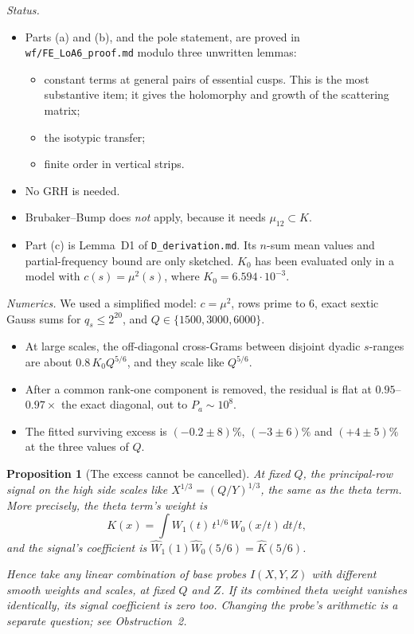 \documentclass[11pt]{article}
\newtheorem{proposition}[theorem]{Proposition}
\theoremstyle{definition}
\theoremstyle{remark}
\begin{document}
\noindent\emph{Status.}
\begin{itemize}[leftmargin=*]
\item Parts (a) and (b), and the pole statement, are proved in \texttt{wf/FE\_LoA6\_proof.md} modulo three unwritten lemmas:
  \begin{itemize}
  \item constant terms at general pairs of essential cusps. This is the most substantive item; it gives the holomorphy and growth of the scattering matrix;
  \item the isotypic transfer;
  \item finite order in vertical strips.
  \end{itemize}
\item No GRH is needed.
\item Brubaker--Bump does \emph{not} apply, because it needs $\mu_{12}\subset K$.
\item Part (c) is Lemma~D1 of \texttt{D\_derivation.md}. Its $n$-sum mean values and partial-frequency bound are only sketched. $K_0$ has been evaluated only in a model with $c(s)=\mu^2(s)$, where $K_0=6.594\cdot10^{-3}$.
\end{itemize}

\noindent\emph{Numerics.} We used a simplified model: $c=\mu^2$, rows prime to $6$, exact sextic Gauss sums for $q_s\le2^{20}$, and $Q\in\{1500,3000,6000\}$.
\begin{itemize}[leftmargin=*]
\item At large scales, the off-diagonal cross-Grams between disjoint dyadic $s$-ranges are about $0.8\,K_0Q^{5/6}$, and they scale like $Q^{5/6}$.
\item After a common rank-one component is removed, the residual is flat at $0.95$--$0.97\times$ the exact diagonal, out to $P_a\sim10^8$.
\item The fitted surviving excess is $(-0.2\pm8)\%$, $(-3\pm6)\%$ and $(+4\pm5)\%$ at the three values of $Q$.
\end{itemize}

\begin{proposition}[The excess cannot be cancelled]\label{prop:nocancel}
At fixed $Q$, the principal-row signal on the high side scales like $X^{1/3}=(Q/Y)^{1/3}$, the same as the theta term. More precisely, the theta term's weight is
\[
K(x)=\int W_1(t)\,t^{1/6}\,W_0(x/t)\,dt/t ,
\]
and the signal's coefficient is $\widehat W_1(1)\widehat W_0(5/6)=\widehat K(5/6)$.

Hence take any linear combination of base probes $I(X,Y,Z)$ with different smooth weights and scales, at fixed $Q$ and $Z$. If its combined theta weight vanishes identically, its signal coefficient is zero too. Changing the probe's arithmetic is a separate question; see Obstruction~2.
\end{proposition}
\end{document}
